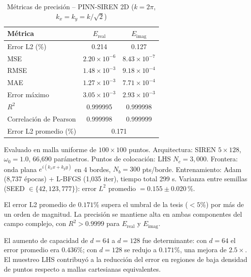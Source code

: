 \begin{table}[htbp]
\centering
\begin{threeparttable}
\caption{Métricas de precisión -- PINN-SIREN 2D ($k = 2\pi$, $k_x = k_y = k/\sqrt{2}$)}
\label{tab:resultados2d}
\begin{tabular}{lcc}
\toprule
Métrica & $E_{\mathrm{real}}$ & $E_{\mathrm{imag}}$ \\
\midrule
Error L2 (\%)          & 0.214 & 0.127 \\
MSE                    & $2.20 \times 10^{-6}$ & $8.43 \times 10^{-7}$ \\
RMSE                   & $1.48 \times 10^{-3}$ & $9.18 \times 10^{-4}$ \\
MAE                    & $1.27 \times 10^{-3}$ & $7.71 \times 10^{-4}$ \\
Error máximo           & $3.05 \times 10^{-3}$ & $2.93 \times 10^{-3}$ \\
$R^2$                  & 0.999995 & 0.999998 \\
Correlación de Pearson & 0.999998 & 0.999999 \\
\midrule
Error L2 promedio (\%) & \multicolumn{2}{c}{0.171} \\
\bottomrule
\end{tabular}
\begin{tablenotes}
\small
\item Evaluado en malla uniforme de $100 \times 100$ puntos.
      Arquitectura: SIREN $5 \times 128$, $\omega_0 = 1.0$, 66{,}690 parámetros.
      Puntos de colocación: LHS $N_c = 3{,}000$.
      Frontera: onda plana $e^{i(k_x x + k_y y)}$ en 4 bordes, $N_b = 300$ pts/borde.
      Entrenamiento: Adam (8{,}737 épocas) + L-BFGS (1{,}035 iter), tiempo total 299 s.
      Varianza entre semillas (SEED $\in \{42, 123, 777\}$):
      error $L^2$ promedio $= 0.155 \pm 0.020$\,\%.
\end{tablenotes}
\end{threeparttable}
\end{table}

El error L2 promedio de $0.171\%$ supera el umbral de la tesis ($< 5\%$) por más de un
orden de magnitud. La precisión se mantiene alta en ambas componentes del campo complejo,
con $R^2 > 0.9999$ para $E_{\mathrm{real}}$ y $E_{\mathrm{imag}}$.

El aumento de capacidad de $d = 64$ a $d = 128$ fue determinante: con $d = 64$ el error
promedio era $0.436\%$; con $d = 128$ se redujo a $0.171\%$, una mejora de $2.5\times$.
El muestreo LHS contribuyó a la reducción del error en regiones de baja densidad de
puntos respecto a mallas cartesianas equivalentes.

